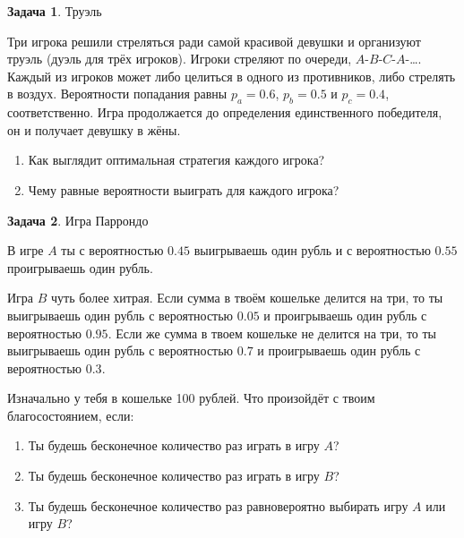 \documentclass[nobib]{tufte-handout}
\theoremstyle{definition}
\newtheorem{problem}{Задача}
\begin{document}
\begin{problem}
Труэль

Три игрока решили стреляться ради самой красивой девушки и организуют труэль (дуэль для трёх игроков).  Игроки стреляют по очереди, $A$-$B$-$C$-$A$-\ldots. Каждый из игроков может либо целиться в одного из противников, либо стрелять в воздух. Вероятности попадания равны $p_a=0.6$, $p_b=0.5$ и $p_c=0.4$, соответственно. Игра продолжается до определения единственного победителя, он и получает девушку в жёны.

\begin{enumerate}
\item Как выглядит оптимальная стратегия каждого игрока?
\item Чему равные вероятности выиграть для каждого игрока?
\end{enumerate}



\end{problem}


\begin{problem}
Игра Паррондо

В игре $A$ ты с вероятностью $0.45$ выигрываешь один рубль и с вероятностью $0.55$ проигрываешь один рубль.

Игра $B$ чуть более хитрая. Если сумма в твоём кошельке делится на три, то ты выигрываешь один рубль с вероятностью $0.05$ и проигрываешь один рубль с вероятностью $0.95$. Если же
сумма в твоем кошельке не делится на три, то ты выигрываешь один рубль с вероятностью $0.7$ и проигрываешь один рубль с вероятностью $0.3$.

Изначально у тебя в кошельке 100 рублей. Что произойдёт с твоим благосостоянием, если:

\begin{enumerate}
\item Ты будешь бесконечное количество раз играть в игру $A$?
\item Ты будешь бесконечное количество раз играть в игру $B$?
\item Ты будешь бесконечное количество раз равновероятно выбирать игру $A$ или игру $B$?
\end{enumerate}



\end{problem}
\end{document}

